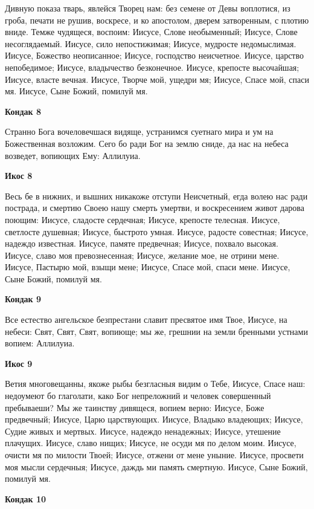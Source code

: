 Дивную
показа тварь, явлейся Творец нам: без семене от Девы воплотися, из гроба, печати не рушив, воскресе, и ко апостолом, дверем затворенным, с плотию вниде. Темже чудящеся, воспоим: Иисусе, Слове необыменный; Иисусе, Слове несоглядаемый. Иисусе, сило непостижимая; Иисусе,
мудросте недомыслимая. Иисусе, Божество неописанное; Иисусе, господство неисчетное. Иисусе, царство непобедимое; Иисусе, владычество безконечное. Иисусе, крепосте высочайшая; Иисусе, власте вечная. Иисусе, Творче мой, ущедри мя; Иисусе, Спасе мой, спаси мя. Иисусе, Сыне Божий, помилуй мя.


\medskip
\bfseries Кондак 8\normalfont{}


Странно
Бога вочеловечшася видяще, устранимся суетнаго мира и ум на Божественная возложим. Сего бо ради Бог на землю сниде, да нас на небеса возведет, вопиющих Ему: Аллилуиа. 


\medskip
\bfseries Икос 8\normalfont{}


Весь
бе в нижних, и вышних никакоже отступи Неисчетный, егда волею нас ради пострада, и смертию Своею нашу смерть умертви, и воскресением живот дарова поющим: Иисусе, сладосте сердечная; Иисусе, крепосте телесная. Иисусе, светлосте душевная; Иисусе, быстрото умная. Иисусе, радосте совестная; Иисусе, надеждо известная. Иисусе, памяте предвечная; Иисусе, похвало высокая. Иисусе, славо моя превознесенная; Иисусе, желание мое, не отрини мене. Иисусе, Пастырю мой, взыщи мене; Иисусе, Спасе мой, спаси мене. Иисусе, Сыне Божий, помилуй мя. 


\medskip
\bfseries Кондак 9\normalfont{}


Все
естество ангельское безпрестани славит пресвятое имя Твое, Иисусе, на небеси: Свят, Свят, Свят, вопиюще; мы же, грешнии на земли бренными устнами вопием: Аллилуиа. 


\medskip
\bfseries Икос 9\normalfont{}


Ветия
многовещанны, якоже рыбы безгласныя видим о Тебе, Иисусе, Спасе наш: недоумеют бо глаголати, како Бог непреложний и человек совершенный пребываеши? Мы же таинству дивящеся, вопием верно: Иисусе, Боже предвечный; Иисусе, Царю царствующих. Иисусе, Владыко владеющих; Иисусе, Судие живых и мертвых. Иисусе, надеждо ненадежных; Иисусе, утешение плачущих. Иисусе, славо нищих; Иисусе, не осуди мя по делом моим. Иисусе, очисти мя по милости Твоей; Иисусе, отжени от мене уныние. Иисусе, просвети моя мысли сердечныя; Иисусе, даждь ми память смертную. Иисусе, Сыне Божий, помилуй мя.


\medskip
\bfseries Кондак 10\normalfont{}


